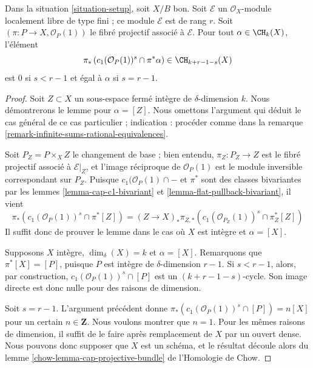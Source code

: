 \begin{lemma}
\label{lemma-cap-projective-bundle}
Dans la situation \ref{situation-setup}, soit $X/B$ bon. Soit $\mathcal{E}$ un
$\mathcal{O}_X$-module localement libre de type fini ; ce module
$\mathcal{E}$ est de rang $r$. Soit $(\pi : P \to X, \mathcal{O}_P(1))$ le
fibré projectif associé à $\mathcal{E}$. Pour tout $\alpha \in \CH_k(X)$,
l'élément
$$
\pi_*\left(
c_1(\mathcal{O}_P(1))^s \cap \pi^*\alpha
\right)
\in
\CH_{k + r - 1 - s}(X)
$$
est $0$ si $s < r - 1$ et égal à $\alpha$ si $s = r - 1$.
\end{lemma}

\begin{proof}
Soit $Z \subset X$ un sous-espace fermé intègre de $\delta$-dimension $k$.
Nous démontrerons le lemme pour $\alpha = [Z]$. Nous omettons l'argument qui
déduit le cas général de ce cas particulier ; indication : procéder comme dans
la remarque \ref{remark-infinite-sums-rational-equivalences}.

\medskip\noindent
Soit $P_Z = P \times_X Z$ le changement de base ; bien entendu, $\pi_Z : P_Z
\to Z$ est le fibré projectif associé à $\mathcal{E}|_Z$, et l'image réciproque
de $\mathcal{O}_P(1)$ est le module inversible correspondant sur $P_Z$. Puisque
$c_1(\mathcal{O}_P(1) \cap -$ et $\pi^*$ sont des classes bivariantes par les
lemmes \ref{lemma-cap-c1-bivariant} et \ref{lemma-flat-pullback-bivariant},
il vient
$$
\pi_*\left(
c_1(\mathcal{O}_P(1))^s \cap \pi^*[Z]
\right)
=
(Z \to X)_*\pi_{Z, *}\left(
c_1(\mathcal{O}_{P_Z}(1))^s \cap \pi_Z^*[Z]
\right)
$$
Il suffit donc de prouver le lemme dans le cas où $X$ est intègre et $\alpha
= [X]$.

\medskip\noindent
Supposons $X$ intègre, $\dim_\delta(X) = k$ et $\alpha = [X]$. Remarquons que
$\pi^*[X] = [P]$, puisque $P$ est intègre de $\delta$-dimension $r - 1$. Si
$s < r - 1$, alors, par construction, $c_1(\mathcal{O}_P(1))^s \cap [P]$ est
un $(k + r - 1 - s)$-cycle. Son image directe est donc nulle pour des raisons
de dimension.

\medskip\noindent
Soit $s = r - 1$. L'argument précédent donne
$\pi_*(c_1(\mathcal{O}_P(1))^s \cap [P]) = n [X]$ pour un certain $n \in
\mathbf{Z}$. Nous voulons montrer que $n = 1$. Pour les mêmes raisons de
dimension, il suffit de le faire après remplacement de $X$ par un ouvert
dense. Nous pouvons donc supposer que $X$ est un schéma, et le résultat découle
alors du lemme \ref{chow-lemma-cap-projective-bundle} de l'Homologie de Chow.
\end{proof}

